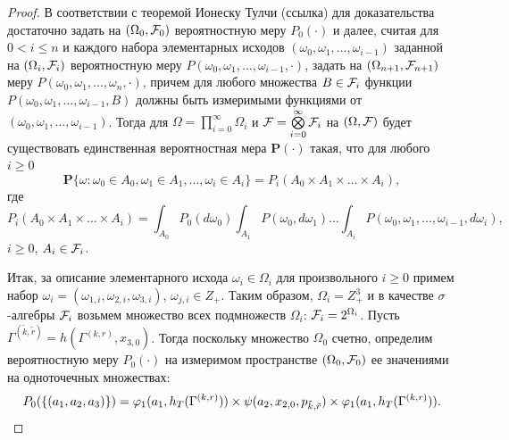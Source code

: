\documentclass[a4paper,12pt,russian]{extarticle}
\newcommand{\ga}[1]{\Gamma^{\left( #1 \right)} }
\renewcommand{\Pr}{{\mathbf P}}
\begin{document}
\begin{proof}
В соответствии с теоремой Ионеску Тулчи (ссылка) для доказательства достаточно задать на $(\Omega_0, {\cal F}_0)$ вероятностную меру $P_0(\cdot)$ и далее, считая для $0 < i \leqslant n$ и каждого набора элементарных исходов $(\omega_0, \omega_1, \ldots, \omega_{i-1})$ заданной на $(\Omega_i, {\cal F}_i)$ вероятностную меру $P(\omega_0,\omega_1,\ldots, \omega_{i-1},\cdot)$, задать на $(\Omega_{n+1}, {\cal F}_{n+1})$ меру $P(\omega_0,\omega_1,\ldots, \omega_{n},\cdot)$, причем для любого множества $B\in {\cal F}_i$ функции $P(\omega_0,\omega_1,\ldots, \omega_{i-1},B)$
должны быть измеримыми функциями от $(\omega_0, \omega_1, \ldots, \omega_{i-1})$. Тогда для $\Omega=\prod\limits_{i=0}^{\infty}\Omega_i$ и ${\cal F}=\bigotimes\limits_{i=0}^{\infty} {\cal F}_i$ на $(\Omega,{\cal F})$ будет существовать единственная вероятностная мера $\Pr(\cdot)$ такая, что для любого $i \geqslant 0$
\begin{equation}
\Pr\{\omega \colon \omega_0 \in A_0, \omega_1 \in A_1, \ldots, \omega_i\in A_i\} = P_i(A_0 \times A_1 \times \ldots \times A_i),
\label{ProbabilitiesGeneral}
\end{equation}
где 
\begin{equation}
 P_i(A_0 \times A_1 \times \ldots \times A_i) = \int_{A_0} P_0(d \omega_0) \int_{A_1} P(\omega_0,d \omega_1) \ldots \int_{A_i} P(\omega_0, \omega_1, \ldots, \omega_{i-1}, d \omega_i),
\label{ProbabilitiesGeneralOne}
\end{equation}
$i\geqslant 0$, $A_i\in {\cal F}_i$. 

Итак, за описание элементарного исхода $\omega_i \in \Omega_i$ для произвольного $i \geqslant 0$ примем набор $\omega_i=(\omega_{1,i},\omega_{2,i},\omega_{3,i})$, $\omega_{j,i}\in Z_+$. Таким образом, $\Omega_i=Z_+^3$ и в качестве $\sigma$-алгебры ${\cal F}_i$ возьмем множество всех подмножеств $\Omega_i$: ${\cal F}_i=2^{\Omega_i}$. Пусть $\ga{\widetilde{k},\widetilde{r}}=h(\ga{k,r},x_{3,0})$. Тогда  поскольку множество $\Omega_0$ счетно, определим вероятностную меру $P_0(\cdot)$ на измеримом пространстве $(\Omega_0,{\cal F}_0)$ ее значениями на одноточечных множествах:
\begin{equation}
P_0(\{(a_1,a_2,a_3)\})=\vp_1(a_1,h_T(\ga{k,r})) \times \psi(a_2,x_{2,0}, p_{\tilde{k},\tilde{r}}) \times \vp_1(a_1,h_T(\ga{k,r})).
\label{probabilitiesOne}
\end{equation}


\end{proof}
\end{document}
